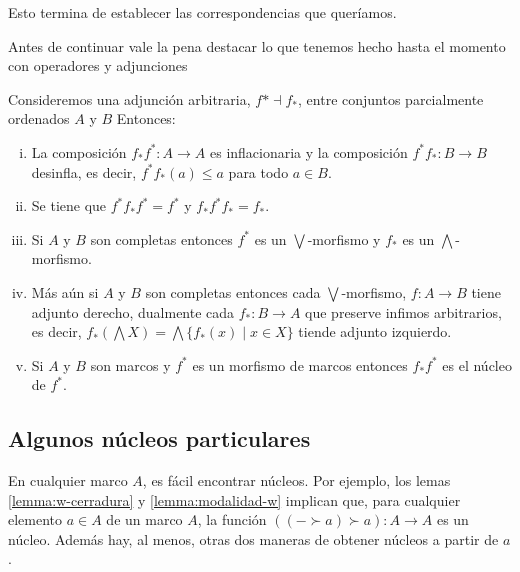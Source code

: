 Esto termina de establecer las correspondencias que queríamos.


Antes de continuar vale la pena destacar lo que tenemos hecho hasta el momento con operadores y adjunciones 

\begin{theorem}\label{posetad}
Consideremos una adjunción arbitraria, $f*\dashv f_{*}$, entre conjuntos parcialmente ordenados $A$ y $B$ 
Entonces:
\begin{enumerate}[(i)]
  \item La composición $f_{*}f^{*}\colon A\rightarrow A$ es inflacionaria y la composición $f^{*}f_{*}\colon B\rightarrow B$ desinfla, es decir, $f^{*}f_{*}(a)\leq a$ para todo $a\in B$.
  \item Se tiene que $f^{*}f_{*}f^{*}=f^{*}$ y $f_{*}f^{*}f_{*}=f_{*}$.
  \item Si $A$ y $B$ son completas entonces $f^{*}$ es un $\bigvee$-morfismo y $f_{*}$ es un $\bigwedge$-morfismo.
  \item Más aún si $A$ y $B$ son completas entonces cada $\bigvee$-morfismo, $f\colon A\rightarrow B$ tiene adjunto derecho, dualmente cada $f_{*}\colon B\rightarrow A$ que preserve infimos arbitrarios, es decir, $f_{*}(\bigwedge X)=\bigwedge\{f_{*}(x)\mid x\in X\}$ tiende adjunto izquierdo. 
  \item Si $A$ y $B$ son marcos y $f^{*}$ es un morfismo de marcos entonces $f_{*}f^{*}$ es el núcleo de $f^{*}$.    
\end{enumerate}
\end{theorem}



\subsection{Algunos núcleos particulares}\label{nucpar}

En cualquier marco $A$, es fácil encontrar núcleos.
Por ejemplo, los lemas \ref{lemma:w-cerradura}
y \ref{lemma:modalidad-w} implican que, para cualquier elemento
$a\in A$ de un marco $A$, la función $((-\succ a)\succ a):A\to A$
es un núcleo.
Además hay, al menos, otras dos maneras de obtener núcleos
a partir de $a$.

